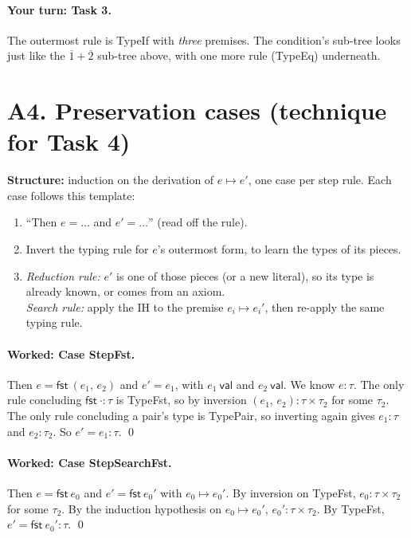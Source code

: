 \documentclass[11pt]{article}
\newcommand{\val}[1]{#1\ \mathsf{val}}
\newcommand{\stepto}[2]{#1 \mapsto #2}
\newcommand{\PAIR}[2]{(#1,\, #2)}
\newcommand{\FST}[1]{\mathsf{fst}\ #1}
\newcommand{\num}[1]{\overline{#1}}
\begin{document}
\paragraph{Your turn: Task 3.} The outermost rule is TypeIf with
\emph{three} premises. The condition's sub-tree looks just like the
$\num1+\num2$ sub-tree above, with one more rule (TypeEq) underneath.

\section*{A4. Preservation cases \hfill (technique for Task 4)}

\textbf{Structure:} induction on the derivation of $\stepto{e}{e'}$, one case
per step rule. Each case follows this template:
\begin{enumerate}
  \item ``Then $e=\ldots$ and $e'=\ldots$'' (read off the rule).
  \item Invert the typing rule for $e$'s outermost form, to learn the types
        of its pieces.
  \item \emph{Reduction rule:} $e'$ is one of those pieces (or a new
        literal), so its type is already known, or comes from an axiom.\\
        \emph{Search rule:} apply the IH to the premise $\stepto{e_i}{e_i'}$,
        then re-apply the same typing rule.
\end{enumerate}

\paragraph{Worked: Case StepFst.} Then $e=\FST{\PAIR{e_1}{e_2}}$ and $e'=e_1$,
with $\val{e_1}$ and $\val{e_2}$. We know $e:\tau$. The only rule concluding
$\FST{\cdot}:\tau$ is TypeFst, so by inversion
$\PAIR{e_1}{e_2}:\tau\times\tau_2$ for some $\tau_2$. The only rule
concluding a pair's type is TypePair, so inverting again gives $e_1:\tau$ and
$e_2:\tau_2$. So $e' = e_1 : \tau$. \qed

\paragraph{Worked: Case StepSearchFst.} Then $e=\FST{e_0}$ and $e'=\FST{e_0'}$
with $\stepto{e_0}{e_0'}$. By inversion on TypeFst, $e_0:\tau\times\tau_2$ for
some $\tau_2$. By the induction hypothesis on $\stepto{e_0}{e_0'}$,
$e_0':\tau\times\tau_2$. By TypeFst, $e'=\FST{e_0'}:\tau$. \qed
\end{document}
